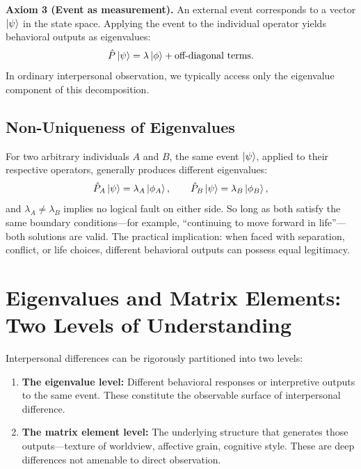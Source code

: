 ﻿\documentclass[11pt,a4paper]{article}
\begin{document}
\textbf{Axiom 3 (Event as measurement).} An external event corresponds to a vector $\ket{\psi}$ in the state space. Applying the event to the individual operator yields behavioral outputs as eigenvalues:
\begin{equation}
\hat{P} \ket{\psi} = \lambda \ket{\phi} + \text{off-diagonal terms}.
\label{eq:measurement}
\end{equation}
In ordinary interpersonal observation, we typically access only the eigenvalue component of this decomposition.

\subsection{Non-Uniqueness of Eigenvalues}

For two arbitrary individuals $A$ and $B$, the same event $\ket{\psi}$, applied to their respective operators, generally produces different eigenvalues:
\begin{equation}
\hat{P}_A \ket{\psi} = \lambda_A \ket{\phi_A},\qquad
\hat{P}_B \ket{\psi} = \lambda_B \ket{\phi_B},
\label{eq:two_evals}
\end{equation}
and $\lambda_A \neq \lambda_B$ implies no logical fault on either side. So long as both satisfy the same boundary conditions---for example, ``continuing to move forward in life''---both solutions are valid. The practical implication: when faced with separation, conflict, or life choices, different behavioral outputs can possess equal legitimacy.

\section{Eigenvalues and Matrix Elements: Two Levels of Understanding}

Interpersonal differences can be rigorously partitioned into two levels:

\begin{enumerate}[label=(\arabic*)]
    \item \textbf{The eigenvalue level:} Different behavioral responses or interpretive outputs to the same event. These constitute the observable surface of interpersonal difference.
    \item \textbf{The matrix element level:} The underlying structure that generates those outputs---texture of worldview, affective grain, cognitive style. These are deep differences not amenable to direct observation.
\end{enumerate}
\end{document}
